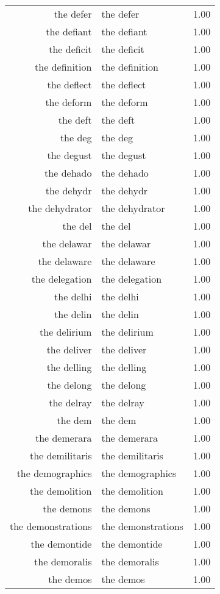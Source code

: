 \begin{table}[ht]
\begin{tabular}{rlr}
  the defer & the defer & 1.00 \\ 
  the defiant & the defiant & 1.00 \\ 
  the deficit & the deficit & 1.00 \\ 
  the definition & the definition & 1.00 \\ 
  the deflect & the deflect & 1.00 \\ 
  the deform & the deform & 1.00 \\ 
  the deft & the deft & 1.00 \\ 
  the deg & the deg & 1.00 \\ 
  the degust & the degust & 1.00 \\ 
  the dehado & the dehado & 1.00 \\ 
  the dehydr & the dehydr & 1.00 \\ 
  the dehydrator & the dehydrator & 1.00 \\ 
  the del & the del & 1.00 \\ 
  the delawar & the delawar & 1.00 \\ 
  the delaware & the delaware & 1.00 \\ 
  the delegation & the delegation & 1.00 \\ 
  the delhi & the delhi & 1.00 \\ 
  the delin & the delin & 1.00 \\ 
  the delirium & the delirium & 1.00 \\ 
  the deliver & the deliver & 1.00 \\ 
  the delling & the delling & 1.00 \\ 
  the delong & the delong & 1.00 \\ 
  the delray & the delray & 1.00 \\ 
  the dem & the dem & 1.00 \\ 
  the demerara & the demerara & 1.00 \\ 
  the demilitaris & the demilitaris & 1.00 \\ 
  the demographics & the demographics & 1.00 \\ 
  the demolition & the demolition & 1.00 \\ 
  the demons & the demons & 1.00 \\ 
  the demonstrations & the demonstrations & 1.00 \\ 
  the demontide & the demontide & 1.00 \\ 
  the demoralis & the demoralis & 1.00 \\ 
  the demos & the demos & 1.00 \\ 

\end{tabular}
\end{table}
